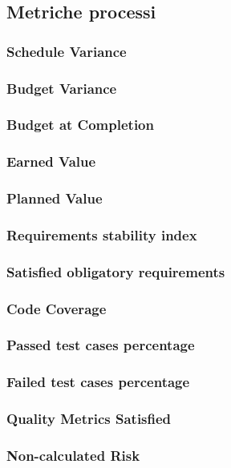 \subsection{Metriche processi}
\subsubsection{Schedule Variance}
\subsubsection{Budget Variance}
\subsubsection{Budget at Completion}
\subsubsection{Earned Value}
\subsubsection{Planned Value}
\subsubsection{Requirements stability index}
\subsubsection{Satisﬁed obligatory requirements}
\subsubsection{Code Coverage}
\subsubsection{Passed test cases percentage}
\subsubsection{Failed test cases percentage}
\subsubsection{Quality Metrics Satisﬁed}
\subsubsection{Non-calculated Risk}